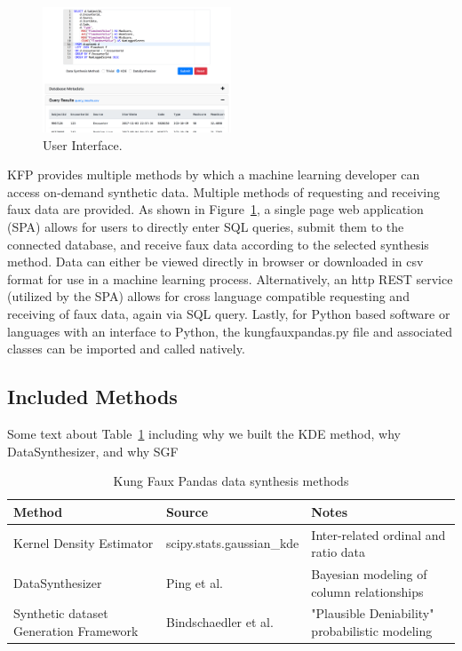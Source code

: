\documentclass{article}
\begin{document}
\begin{figure}%
  \centering
  \includegraphics[width=0.5\textwidth]{ui_screenshot3}
  \caption{User Interface.}
  \label{fig:ui}
\end{figure}
KFP provides multiple methods by which a machine learning developer can access on-demand synthetic data. Multiple methods of requesting and receiving faux data are provided. As shown in Figure~\ref{fig:ui}, a single page web application (SPA) allows for users to directly enter SQL queries, submit them to the connected database, and receive faux data according to the selected synthesis method. Data can either be viewed directly in browser or downloaded in csv format for use in a machine learning process. Alternatively, an http REST service (utilized by the SPA) allows for cross language compatible requesting and receiving of faux data, again via SQL query. Lastly, for Python based software or languages with an interface to Python, the kungfauxpandas.py file and associated classes can be imported and called natively.

\subsection{Included Methods}

Some text about Table~\ref{included-methods} including why we built the KDE method, why DataSynthesizer, and why SGF%

\begin{table}
  \caption{Kung Faux Pandas data synthesis methods}
  \label{included-methods}
  \centering
  \begin{tabular}{p{12em} l p{14em}}
    \toprule
    Method                                 & Source                    & Notes \\
    \midrule
    Kernel Density Estimator               & scipy.stats.gaussian\_kde & Inter-related ordinal and ratio data\\
    DataSynthesizer                        & Ping et al.               & Bayesian modeling of column relationships\\
    Synthetic dataset Generation Framework & Bindschaedler et al.      & "Plausible Deniability" probabilistic modeling\\
    \bottomrule
  \end{tabular}
\end{table}
\end{document}
